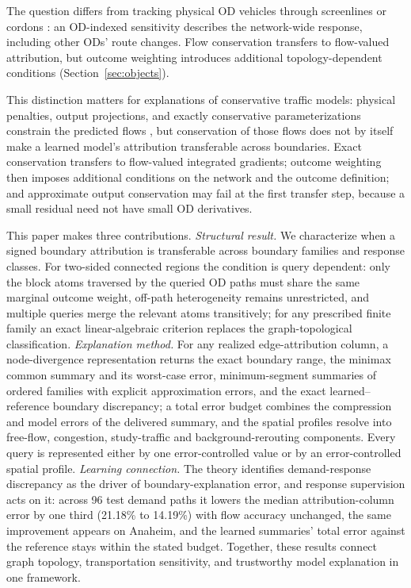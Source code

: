 \documentclass[a4paper,fleqn]{cas-sc}
\begin{document}
The question differs from tracking physical OD vehicles through screenlines
or cordons \citep{sheffi1985urban,vanzuylen1980most,bar2002origin}:
an OD-indexed sensitivity describes the network-wide response,
including other ODs' route changes. Flow conservation transfers to
flow-valued attribution, but outcome weighting introduces additional
topology-dependent conditions (Section~\ref{sec:objects}).

This distinction matters for explanations of conservative traffic
models: physical penalties, output projections, and exactly
conservative parameterizations constrain the predicted flows
\citep{raissi2019physics,shi2021physics,valente2025physics,richterpowell2022neural},
but conservation of those flows does not by itself make a learned
model's attribution transferable across boundaries. Exact
conservation transfers to flow-valued integrated gradients; outcome
weighting then imposes additional conditions on the network and the
outcome definition; and approximate output conservation may fail at
the first transfer step, because a small residual need not have small
OD derivatives.

This paper makes three contributions. \emph{Structural result.} We
characterize when a signed boundary attribution is transferable across
boundary families and response classes. For two-sided connected
regions the condition is query dependent: only the block atoms
traversed by the queried OD paths must share the same marginal outcome
weight, off-path heterogeneity remains unrestricted, and multiple
queries merge the relevant atoms transitively; for any prescribed
finite family an exact linear-algebraic criterion replaces the
graph-topological classification. \emph{Explanation method.} For any
realized edge-attribution column, a node-divergence representation
returns the exact boundary range, the minimax common summary and its
worst-case error, minimum-segment summaries of ordered families with
explicit approximation errors, and the exact learned--reference
boundary discrepancy; a total error budget combines the compression
and model errors of the delivered summary, and the spatial profiles
resolve into free-flow, congestion, study-traffic and
background-rerouting components. Every query is represented either by
one error-controlled value or by an error-controlled spatial profile.
\emph{Learning connection.} The theory identifies demand-response
discrepancy as the driver of boundary-explanation error, and response
supervision acts on it: across 96 test demand paths it lowers the
median attribution-column error by one third (21.18\% to 14.19\%)
with flow accuracy unchanged, the same improvement appears on Anaheim,
and the learned summaries' total error against the reference stays
within the stated budget. Together, these results connect graph
topology, transportation sensitivity, and trustworthy model
explanation in one framework.
\end{document}
